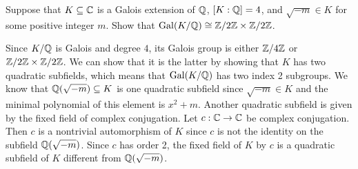 %
\begin{question}[subtitle = August 2017 Problem 4,ID=Aug17_4]
Suppose that $K\subseteq \mathbb{C}$ is a Galois extension of $\mathbb{Q}$, $[K:\mathbb{Q}]=4$, and $\sqrt{-m} \in K$ for some positive integer $m$. Show that $\operatorname{Gal}(K/\mathbb{Q}) \cong \mathbb{Z}/2\mathbb{Z} \times \mathbb{Z}/2\mathbb{Z}$.
\end{question}
\begin{solution}
Since $K/\mathbb{Q}$ is Galois and degree $4$, its Galois group is either $\mathbb{Z}/4\mathbb{Z}$ or $\mathbb{Z}/2\mathbb{Z} \times \mathbb{Z}/2\mathbb{Z}$. We can show that it is the latter by showing that $K$ has two quadratic subfields, which means that $\operatorname{Gal}(K/\mathbb{Q})$ has two index 2 subgroups. We know that $\mathbb{Q}(\sqrt{-m})\subseteq K$ is one quadratic subfield since $\sqrt{-m} \in K$ and the minimal polynomial of this element is $x^2+m$. Another quadratic subfield is given by the fixed field of complex conjugation. Let $c: \mathbb{C} \to \mathbb{C}$ be complex conjugation. Then $c$ is a nontrivial automorphism of $K$ since $c$ is not the identity on the subfield $\mathbb{Q}(\sqrt{-m})$. Since $c$ has order 2, the fixed field of $K$ by $c$ is a quadratic subfield of $K$ different from $\mathbb{Q}(\sqrt{-m})$.
\end{solution}

